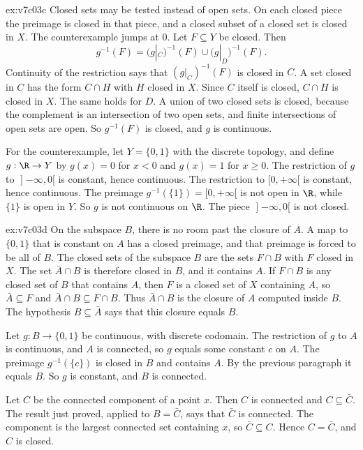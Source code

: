 \begin{solution}{ex:v7c03c}
\idea Closed sets may be tested instead of open sets. On each closed piece the preimage is closed in that piece, and a closed subset of a closed set is closed in $X$. The counterexample jumps at $0$.
\writeup Let $F\subseteq Y$ be closed. Then
\[
g^{-1}(F)=\bigl(g|_C\bigr)^{-1}(F)\cup\bigl(g|_D\bigr)^{-1}(F).
\]
Continuity of the restriction says that $(g|_C)^{-1}(F)$ is closed in $C$. A set closed in $C$ has the form $C\cap H$ with $H$ closed in $X$. Since $C$ itself is closed, $C\cap H$ is closed in $X$. The same holds for $D$. A union of two closed sets is closed, because the complement is an intersection of two open sets, and finite intersections of open sets are open. So $g^{-1}(F)$ is closed, and $g$ is continuous.

For the counterexample, let $Y=\{0,1\}$ with the discrete topology, and define $g:\R\to Y$ by $g(x)=0$ for $x<0$ and $g(x)=1$ for $x\ge0$. The restriction of $g$ to $\mathopen]-\infty,0[$ is constant, hence continuous. The restriction to $[0,+\infty[$ is constant, hence continuous. The preimage $g^{-1}(\{1\})=[0,+\infty[$ is not open in $\R$, while $\{1\}$ is open in $Y$. So $g$ is not continuous on $\R$. The piece $\mathopen]-\infty,0[$ is not closed.
\end{solution}

\begin{solution}{ex:v7c03d}
\idea On the subspace $B$, there is no room past the closure of $A$. A map to $\{0,1\}$ that is constant on $A$ has a closed preimage, and that preimage is forced to be all of $B$.
\writeup The closed sets of the subspace $B$ are the sets $F\cap B$ with $F$ closed in $X$. The set $\bar A\cap B$ is therefore closed in $B$, and it contains $A$. If $F\cap B$ is any closed set of $B$ that contains $A$, then $F$ is a closed set of $X$ containing $A$, so $\bar A\subseteq F$ and $\bar A\cap B\subseteq F\cap B$. Thus $\bar A\cap B$ is the closure of $A$ computed inside $B$. The hypothesis $B\subseteq\bar A$ says that this closure equals $B$.

Let $g:B\to\{0,1\}$ be continuous, with discrete codomain. The restriction of $g$ to $A$ is continuous, and $A$ is connected, so $g$ equals some constant $c$ on $A$. The preimage $g^{-1}(\{c\})$ is closed in $B$ and contains $A$. By the previous paragraph it equals $B$. So $g$ is constant, and $B$ is connected.

Let $C$ be the connected component of a point $x$. Then $C$ is connected and $C\subseteq\bar C$. The result just proved, applied to $B=\bar C$, says that $\bar C$ is connected. The component is the largest connected set containing $x$, so $\bar C\subseteq C$. Hence $C=\bar C$, and $C$ is closed.
\end{solution}


